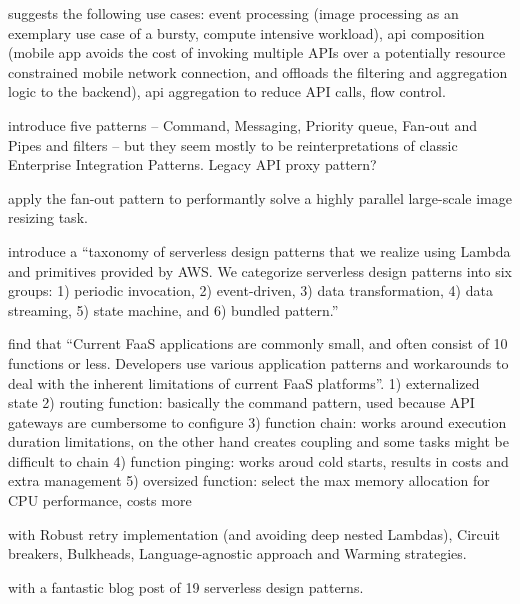 \textcite{baldini17currentTrends} suggests the following use cases: event processing (image processing as an exemplary use case of a bursty, compute intensive workload), api composition (mobile app avoids the cost of invoking multiple APIs over a potentially resource constrained mobile network connection, and offloads the filtering and aggregation logic to the backend), api aggregation to reduce API calls, flow control.

\textcite{sbarski2017serverless} introduce five patterns -- Command, Messaging, Priority queue, Fan-out and Pipes and filters -- but they seem mostly to be reinterpretations of classic Enterprise Integration Patterns. Legacy API proxy pattern?

\textcite{mcgrath16cloudEventParadigms} apply the fan-out pattern to performantly solve a highly parallel large-scale image resizing task.

\textcite{hong18securingviaserverlesspatterns} introduce a ``taxonomy of serverless design patterns that we realize using Lambda and primitives provided by AWS. We categorize serverless design patterns into six groups: 1) periodic invocation, 2) event-driven, 3) data transformation, 4) data streaming, 5) state machine, and 6) bundled pattern.''

\textcite{leitner18industrialpractice} find that ``Current FaaS applications are commonly small, and often consist of 10 functions or less. Developers use various application patterns and workarounds to deal with the inherent limitations of current FaaS platforms''.
1) externalized state
2) routing function: basically the command pattern, used because API gateways are cumbersome to configure
3) function chain: works around execution duration limitations, on the other hand creates coupling and some tasks might be difficult to chain
4) function pinging: works aroud cold starts, results in costs and extra management
5) oversized function: select the max memory allocation for CPU performance, costs more

\textcite{bardsley18optimizationStrategies} with Robust retry implementation (and avoiding deep nested Lambdas), Circuit breakers, Bulkheads, Language-agnostic approach and Warming strategies.

\textcite{daly18blogPatterns} with a fantastic blog post of 19 serverless design patterns.

